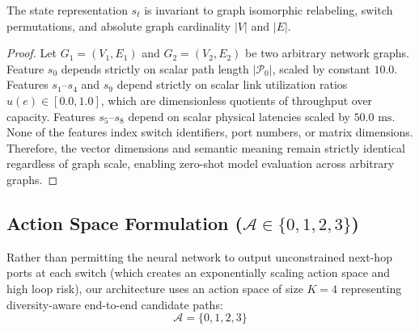 \begin{theorem}
The state representation $s_t$ is invariant to graph isomorphic relabeling, switch permutations, and absolute graph cardinality $|V|$ and $|E|$.
\end{theorem}

\begin{proof}
Let $G_1 = (V_1, E_1)$ and $G_2 = (V_2, E_2)$ be two arbitrary network graphs. Feature $s_0$ depends strictly on scalar path length $|\mathcal{P}_0|$, scaled by constant $10.0$. Features $s_1$--$s_4$ and $s_9$ depend strictly on scalar link utilization ratios $u(e) \in [0.0, 1.0]$, which are dimensionless quotients of throughput over capacity. Features $s_5$--$s_8$ depend on scalar physical latencies scaled by $50.0\text{ ms}$. None of the features index switch identifiers, port numbers, or matrix dimensions. Therefore, the vector dimensions and semantic meaning remain strictly identical regardless of graph scale, enabling zero-shot model evaluation across arbitrary graphs.
\end{proof}

\subsection{Action Space Formulation ($\mathcal{A} \in \{0, 1, 2, 3\}$)}
Rather than permitting the neural network to output unconstrained next-hop ports at each switch (which creates an exponentially scaling action space and high loop risk), our architecture uses an action space of size $K=4$ representing diversity-aware end-to-end candidate paths:
\begin{equation}
    \mathcal{A} = \{0, 1, 2, 3\}
\end{equation}

